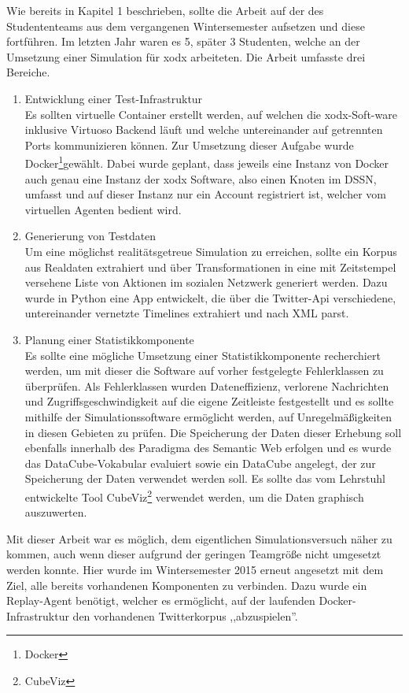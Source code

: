 \documentclass{article}
\begin{document}
Wie bereits in Kapitel 1 beschrieben, sollte die Arbeit auf der des Studententeams aus dem vergangenen Wintersemester aufsetzen und diese fortführen. Im letzten Jahr waren es 5, später 3 Studenten, welche an der Umsetzung einer Simulation für xodx arbeiteten. Die Arbeit umfasste drei Bereiche.
\begin{enumerate}
	\item{Entwicklung einer Test-Infrastruktur\\
	Es sollten virtuelle Container erstellt werden, auf welchen die xodx-Soft-ware inklusive Virtuoso Backend läuft und welche untereinander auf getrennten Ports kommunizieren können. Zur Umsetzung dieser Aufgabe wurde Docker\footnote{Docker}gewählt. Dabei wurde geplant, dass jeweils eine Instanz von Docker auch genau eine Instanz der xodx Software, also einen Knoten im DSSN, umfasst und auf dieser Instanz nur ein Account registriert ist, welcher vom virtuellen Agenten bedient wird.}
	\item{Generierung von Testdaten\\
	Um eine möglichst realitätsgetreue Simulation zu erreichen, sollte ein Korpus aus Realdaten extrahiert und über Transformationen in eine mit Zeitstempel versehene Liste von Aktionen im sozialen Netzwerk generiert werden. Dazu wurde in Python eine App entwickelt, die über die Twitter-Api verschiedene, untereinander vernetzte Timelines extrahiert und nach XML parst.}
	\item{Planung einer Statistikkomponente\\
	Es sollte eine mögliche Umsetzung einer Statistikkomponente  recherchiert werden, um mit dieser die Software auf vorher festgelegte Fehlerklassen zu überprüfen. Als Fehlerklassen wurden Dateneffizienz, verlorene Nachrichten und Zugriffsgeschwindigkeit auf die eigene Zeitleiste festgestellt und es sollte mithilfe der Simulationssoftware ermöglicht werden, auf Unregelmäßigkeiten in diesen Gebieten zu prüfen. Die Speicherung der Daten dieser Erhebung soll ebenfalls innerhalb des Paradigma des Semantic Web erfolgen und es wurde das DataCube-Vokabular evaluiert sowie ein DataCube angelegt, der zur Speicherung der Daten verwendet werden soll. Es sollte das vom Lehrstuhl entwickelte Tool CubeViz\footnote{CubeViz} verwendet werden, um die Daten graphisch auszuwerten.}
\end{enumerate}
Mit dieser Arbeit war es möglich, dem eigentlichen Simulationsversuch näher zu kommen, auch wenn dieser aufgrund der geringen Teamgröße nicht umgesetzt werden konnte. Hier wurde im Wintersemester 2015 erneut angesetzt mit dem Ziel, alle bereits vorhandenen Komponenten zu verbinden. Dazu wurde ein Replay-Agent benötigt, welcher es ermöglicht, auf der laufenden Docker-Infrastruktur den vorhandenen Twitterkorpus ,,abzuspielen''.\\
\end{document}
